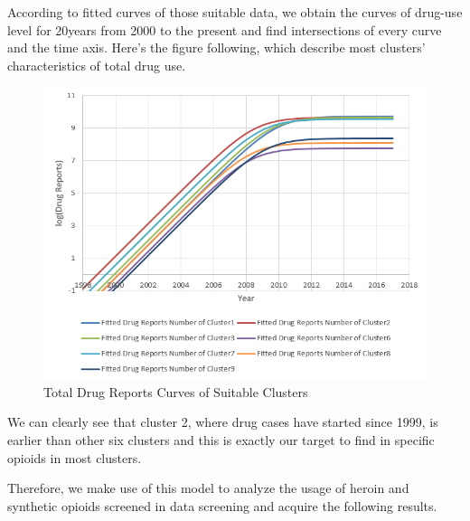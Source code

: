 \documentclass[11pt]{article}
\begin{document}
According to fitted curves of those suitable data, we obtain the curves of drug-use level for 20years from 2000 to the present and find intersections of every curve and the time axis. Here’s the figure following, which describe most clusters’ characteristics of total drug use.
\begin{figure}[H]
	\centering
	\includegraphics[scale=0.6]{./figures/2.png}
	\caption{Total Drug Reports Curves of Suitable Clusters}
\end{figure}

We can clearly see that cluster 2, where drug cases have started since 1999, is earlier than other six clusters and this is exactly our target to find in specific opioids in most clusters.

Therefore, we make use of this model to analyze the usage of heroin and synthetic opioids screened in data screening and acquire the following results.
\end{document}
